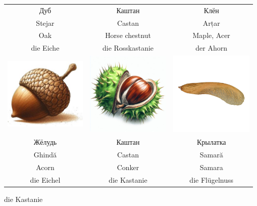 \documentclass[a5paper,11pt]{memoir}
\begin{document}
\begin{table}[h]
\begin{tabular}{ccc}
		Дуб  &  Каштан        &   Клён            \\
		Stejar  &  Castan        &   Arțar            \\
		Oak  &   Horse chestnut        &   Maple, Acer \\
		die Eiche  &   die Rosskastanie     &   der Ahorn \\
		\includegraphics[height=3.4cm]{images/tree-guide/oak-acorn} & \includegraphics[height=4cm]{images/tree-guide/chestnut-fruit} &
		 \includegraphics[height=4cm]{images/tree-guide/maple-samara} \\
		Жёлудь       &  Каштан    &     Крылатка  \\    
		Ghindă       &  Castan    &     Samară  \\    
		Acorn        &  Conker	  & Samara  \\    
		die Eichel &  die Kastanie    &     die Flügelnuss\\    
	\end{tabular}die Kastanie
\end{table}




\end{document}

